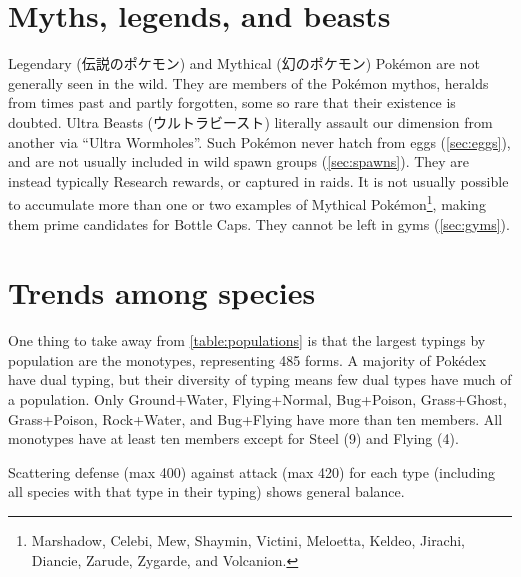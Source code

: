 \section{Myths, legends, and beasts}
\label{sec:myths}
Legendary (\textjapanese{伝説のポケモン}) and Mythical (\textjapanese{幻のポケモン}) Pokémon
 are not generally seen in the wild.
They are members of the Pokémon mythos, heralds from times past and partly forgotten,
  some so rare that their existence is doubted.
Ultra Beasts (\textjapanese{ウルトラビースト}) literally assault our dimension from
  another via ``Ultra Wormholes''.
Such Pokémon never hatch from eggs (\autoref{sec:eggs}), and are not usually included in wild spawn groups (\autoref{sec:spawns}).
They are instead typically Research rewards, or captured in raids.
It is not usually possible to accumulate more than one or two examples of Mythical
  Pokémon\footnote{Marshadow, Celebi, Mew, Shaymin, Victini, Meloetta, Keldeo,
  Jirachi, Diancie, Zarude, Zygarde, and Volcanion.}, making them prime
  candidates for Bottle Caps.
They cannot be left in gyms (\autoref{sec:gyms}).

\section{Trends among species}
One thing to take away from \autoref{table:populations} is that the largest
  typings by population are the monotypes, representing 485 forms.
A majority of Pokédex have dual typing, but their diversity of typing means few dual types have much of a population.
Only Ground+Water, Flying+Normal, Bug+Poison, Grass+Ghost, Grass+Poison, Rock+Water, and Bug+Flying
  have more than ten members.
All monotypes have at least ten members except for Steel (9) and Flying (4).

Scattering defense (max 400) against attack (max 420) for each type
  (including all species with that type in their typing) shows general
  balance.

